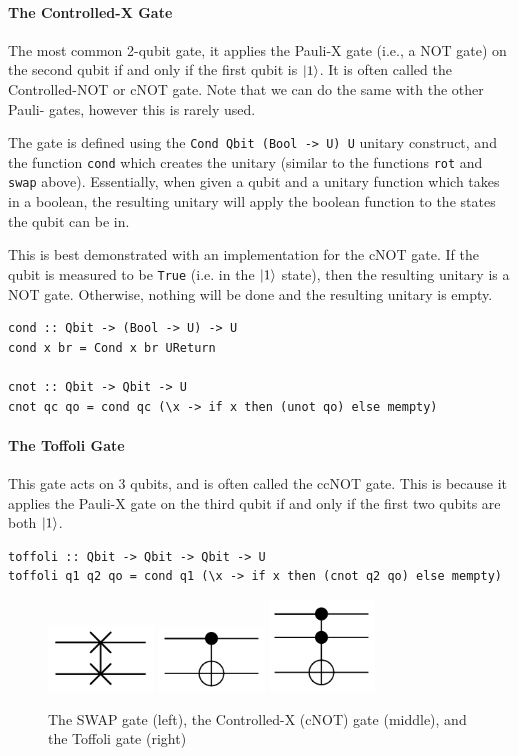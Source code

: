 \documentclass[a4paper,10pt, titlepage, twoside]{article}
\begin{document}
\paragraph{The Controlled-X Gate}
The most common 2-qubit gate, it applies the Pauli-X gate (i.e., a NOT gate) on the second qubit if and only if the first qubit is $\ket{1}$. It is often called the Controlled-NOT or cNOT gate. Note that we can do the same with the other Pauli- gates, however this is rarely used.\par
The gate is defined using the \texttt{Cond Qbit (Bool -> U) U} unitary construct, and the function \texttt{cond} which creates the unitary (similar to the functions \texttt{rot} and \texttt{swap} above). Essentially, when given a qubit and a unitary function which takes in a boolean, the resulting unitary will apply the boolean function to the states the qubit can be in.\par
This is best demonstrated with an implementation for the cNOT gate. If the qubit is measured to be \texttt{True} (i.e. in the $\ket{1}$ state), then the resulting unitary is a NOT gate. Otherwise, nothing will be done and the resulting unitary is empty.
\begin{verbatim}
cond :: Qbit -> (Bool -> U) -> U
cond x br = Cond x br UReturn

cnot :: Qbit -> Qbit -> U
cnot qc qo = cond qc (\x -> if x then (unot qo) else mempty)
\end{verbatim}

\paragraph{The Toffoli Gate}
This gate acts on 3 qubits, and is often called the ccNOT gate. This is because it applies the Pauli-X gate on the third qubit if and only if the first two qubits are both $\ket{1}$. 
\begin{verbatim}
toffoli :: Qbit -> Qbit -> Qbit -> U
toffoli q1 q2 qo = cond q1 (\x -> if x then (cnot q2 qo) else mempty)
\end{verbatim}
\begin{figure}[H]
	\centering
	\includegraphics[width=0.25\textwidth]{swap}
	\includegraphics[width=0.25\textwidth]{cnot}
	\includegraphics[width=0.25\textwidth]{toffoli}
	\caption{The SWAP gate (left), the Controlled-X (cNOT) gate (middle), and the Toffoli gate (right)}
\end{figure}
\end{document}
